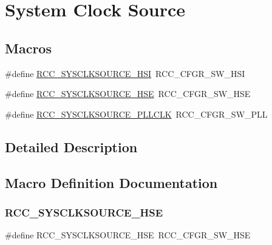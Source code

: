\hypertarget{group___r_c_c___system___clock___source}{}\section{System Clock Source}
\label{group___r_c_c___system___clock___source}
\subsection*{Macros}
\begin{DoxyCompactItemize}
\item 
\#define \hyperlink{group___r_c_c___system___clock___source_gaaeeb699502e7d7a9f1b5d57fcf1f5095}{R\+C\+C\+\_\+\+S\+Y\+S\+C\+L\+K\+S\+O\+U\+R\+C\+E\+\_\+\+H\+SI}~R\+C\+C\+\_\+\+C\+F\+G\+R\+\_\+\+S\+W\+\_\+\+H\+SI
\item 
\#define \hyperlink{group___r_c_c___system___clock___source_ga9116d0627e1e7f33c48e1357b9a35a1c}{R\+C\+C\+\_\+\+S\+Y\+S\+C\+L\+K\+S\+O\+U\+R\+C\+E\+\_\+\+H\+SE}~R\+C\+C\+\_\+\+C\+F\+G\+R\+\_\+\+S\+W\+\_\+\+H\+SE
\item 
\#define \hyperlink{group___r_c_c___system___clock___source_ga5caf08ac71d7dd7e7b2e3e421606aca7}{R\+C\+C\+\_\+\+S\+Y\+S\+C\+L\+K\+S\+O\+U\+R\+C\+E\+\_\+\+P\+L\+L\+C\+LK}~R\+C\+C\+\_\+\+C\+F\+G\+R\+\_\+\+S\+W\+\_\+\+P\+LL
\end{DoxyCompactItemize}


\subsection{Detailed Description}


\subsection{Macro Definition Documentation}
\mbox{\label{group___r_c_c___system___clock___source_ga9116d0627e1e7f33c48e1357b9a35a1c}} 
\subsubsection{\texorpdfstring{R\+C\+C\+\_\+\+S\+Y\+S\+C\+L\+K\+S\+O\+U\+R\+C\+E\+\_\+\+H\+SE}{RCC\_SYSCLKSOURCE\_HSE}}
{\footnotesize\ttfamily \#define R\+C\+C\+\_\+\+S\+Y\+S\+C\+L\+K\+S\+O\+U\+R\+C\+E\+\_\+\+H\+SE~R\+C\+C\+\_\+\+C\+F\+G\+R\+\_\+\+S\+W\+\_\+\+H\+SE}

